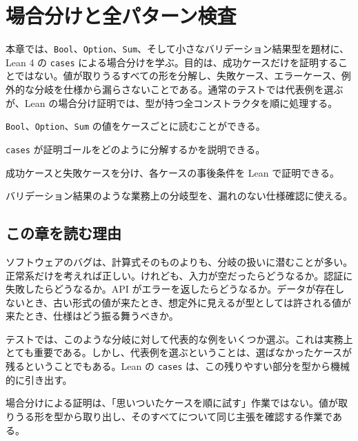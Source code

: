 \chapter{場合分けと全パターン検査}
\label{chap:cases-patterns}

\begin{chapterabstract}
本章では、\texttt{Bool}、\texttt{Option}、\texttt{Sum}、そして小さなバリデーション結果型を題材に、Lean 4 の \texttt{cases} による場合分けを学ぶ。目的は、成功ケースだけを証明することではない。値が取りうるすべての形を分解し、失敗ケース、エラーケース、例外的な分岐を仕様から漏らさないことである。通常のテストでは代表例を選ぶが、Lean の場合分け証明では、型が持つ全コンストラクタを順に処理する。
\end{chapterabstract}

\begin{learninggoals}
\item \texttt{Bool}、\texttt{Option}、\texttt{Sum} の値をケースごとに読むことができる。
\item \texttt{cases} が証明ゴールをどのように分解するかを説明できる。
\item 成功ケースと失敗ケースを分け、各ケースの事後条件を Lean で証明できる。
\item バリデーション結果のような業務上の分岐型を、漏れのない仕様確認に使える。
\end{learninggoals}

\section{この章を読む理由}

ソフトウェアのバグは、計算式そのものよりも、分岐の扱いに潜むことが多い。正常系だけを考えれば正しい。けれども、入力が空だったらどうなるか。認証に失敗したらどうなるか。API がエラーを返したらどうなるか。データが存在しないとき、古い形式の値が来たとき、想定外に見えるが型としては許される値が来たとき、仕様はどう振る舞うべきか。

テストでは、このような分岐に対して代表的な例をいくつか選ぶ。これは実務上とても重要である。しかし、代表例を選ぶということは、選ばなかったケースが残るということでもある。Lean の \texttt{cases} は、この残りやすい部分を型から機械的に引き出す。

\begin{intuitionbox}
場合分けによる証明は、「思いついたケースを順に試す」作業ではない。値が取りうる形を型から取り出し、そのすべてについて同じ主張を確認する作業である。
\end{intuitionbox}

